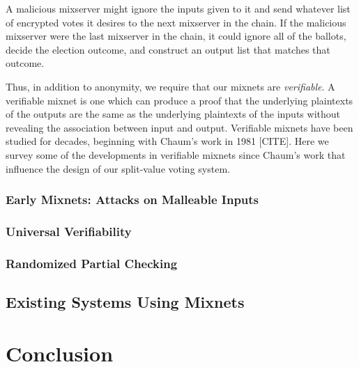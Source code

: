 A malicious mixserver might ignore the inputs given to it and send whatever list of encrypted votes it desires to the next mixserver in the chain. If the malicious mixserver were the last mixserver in the chain, it could ignore all of the ballots, decide the election outcome, and construct an output list that matches that outcome.

Thus, in addition to anonymity, we require that our mixnets are \emph{verifiable}. A verifiable mixnet is one which can produce a proof that the underlying plaintexts of the outputs are the same as the underlying plaintexts of the inputs without revealing the association between input and output. Verifiable mixnets have been studied for decades, beginning with Chaum's work in 1981 [CITE]. Here we survey some of the developments in verifiable mixnets since Chaum's work that influence the design of our split-value voting system.

\subsubsection{Early Mixnets: Attacks on Malleable Inputs}

\subsubsection{Universal Verifiability}

\subsubsection{Randomized Partial Checking}

\subsection{Existing Systems Using Mixnets}

\section{Conclusion}






